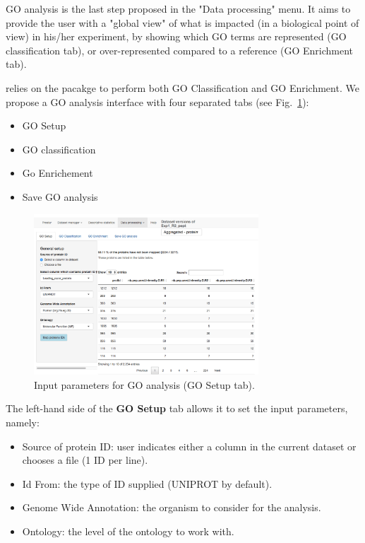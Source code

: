 \documentclass[12pt]{article}
\begin{document}
{GO analysis is the last step proposed in the "Data 
processing" menu. It aims to provide the user with a "global view" of what is 
impacted (in a biological point of view) in his/her experiment, by showing which
GO terms are represented (GO classification tab), or over-represented compared 
to a reference (GO Enrichment tab). 

 relies on the  pacakge to perform both GO 
Classification and GO Enrichment. We propose a GO analysis interface with
four separated tabs (see Fig.~\ref{fig:GO_tab1}): 
    \begin{itemize}
\item GO Setup 
\item GO classification
\item Go Enrichement
\item Save GO analysis
\end{itemize}

\begin {figure}
\centering
\includegraphics[width=0.75\textwidth]{images/GO_tab1.png}
\caption{Input parameters for GO analysis (GO Setup tab).}\label{fig:GO_tab1}
\end {figure}

The left-hand side of the \textbf{GO Setup} tab allows it to set the input parameters, namely: 
\begin{itemize}
\item Source of protein ID: user indicates either a column in the current 
dataset or chooses a file (1 ID per line). 
\item Id From: the type of ID supplied (UNIPROT by default).
\item Genome Wide Annotation: the organism to consider for the analysis.  
\item Ontology: the level of the ontology to work with. 
\end{itemize}

}
\end{document}

